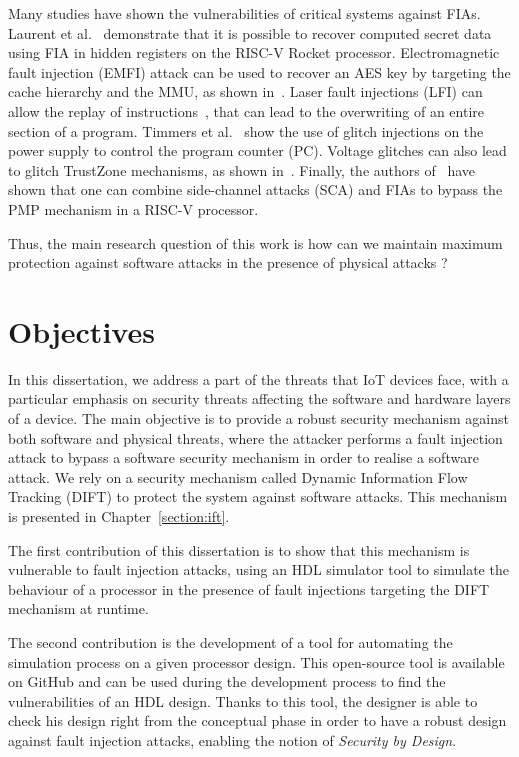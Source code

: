 Many studies have shown the vulnerabilities of critical systems against FIAs.
Laurent et al.~\cite{LBDP-19-date} demonstrate that it is possible to recover computed secret data using FIA in hidden registers on the RISC-V Rocket processor. 
Electromagnetic fault injection (EMFI) attack can be used to recover an AES key by targeting the cache hierarchy and the MMU, as shown in~\cite{TBELB-21-jce}.
Laser fault injections (LFI) can allow the replay of instructions~\cite{KDD-21-dsd}, that can lead to the overwriting of an entire section of a program.
Timmers et al.~\cite{TSW-16-fdtc} show the use of glitch injections on the power supply to control the program counter (PC). Voltage glitches can also lead to glitch TrustZone mechanisms, as shown in~\cite{SMS-23-usenix}.
Finally, the authors of~\cite{NSUH-21-tches} have shown that one can combine side-channel attacks (SCA) and FIAs to bypass the PMP mechanism in a RISC-V processor.

Thus, the main research question of this work is how can we maintain maximum protection against software attacks in the presence of physical attacks ?

\section{Objectives}

In this dissertation, we address a part of the threats that IoT devices face, with a particular emphasis on security threats affecting the software and hardware layers of a device. The main objective is to provide a robust security mechanism against both software and physical threats, where the attacker performs a fault injection attack to bypass a software security mechanism in order to realise a software attack.
We rely on a security mechanism called Dynamic Information Flow Tracking (DIFT) to protect the system against software attacks. This mechanism is presented in Chapter~\ref{section:ift}.

The first contribution of this dissertation is to show that this mechanism is vulnerable to fault injection attacks, using an HDL simulator tool to simulate the behaviour of a processor in the presence of fault injections targeting the DIFT mechanism at runtime.

The second contribution is the development of a tool for automating the simulation process on a given processor design. This open-source tool is available on GitHub and can be used during the development process to find the vulnerabilities of an HDL design. Thanks to this tool, the designer is able to check his design right from the conceptual phase in order to have a robust design against fault injection attacks, enabling the notion of \textit{Security by Design}.

